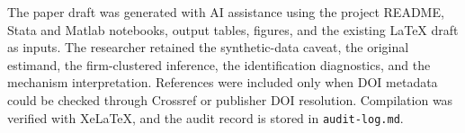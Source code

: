 \documentclass[11pt]{article}
\begin{document}
The paper draft was generated with AI assistance using the project README, Stata and Matlab notebooks, output tables, figures, and the existing LaTeX draft as inputs. The researcher retained the synthetic-data caveat, the original estimand, the firm-clustered inference, the identification diagnostics, and the mechanism interpretation. References were included only when DOI metadata could be checked through Crossref or publisher DOI resolution. Compilation was verified with XeLaTeX, and the audit record is stored in \texttt{audit-log.md}.



\end{document}
